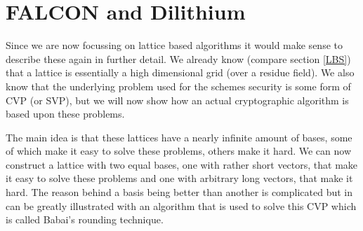 \documentclass[conference]{IEEEtran}
\newcommand{\comment}[1]{}
\begin{document}
\comment{ %
} %

\comment{ %
wahrscheinlich skippen da mir da hintergrund zu braid groups etc fehlt
} %

\comment{ %
not in the endgame but also not broken afaik
} %

\section{FALCON and Dilithium}\label{falcon}
\comment{ %
falcon-512 (L1):
pubk/sig 897/690 bytes (dil3: 1472/2701 ecdsa: 64)
keygen: 182m clk , 118mJ (dil3: 2.3m / 1.7mJ ecdsa 5mJ)
sign/ver: 23.5/0.345 mJ (dil3 5mJ/1.7mJ ecdsa 4mJ)

falcon-1024 (L5):
pubk/sig 1793/1330 bytes
keygen: 380m clk , 232mJ
sign/ver: 45.5/0.69 mJ
\cite{Energy_comp}

} %
Since we are now focussing on lattice based algorithms it would make sense to describe these again in further detail.
We already know (compare section \ref{LBS}) that a lattice is essentially a high dimensional grid (over a residue field). %
We also know that the underlying problem used for the schemes security is some form of CVP (or SVP), but we will now show how an actual cryptographic algorithm is based upon these problems.

The main idea is that these lattices have a nearly infinite amount of bases, some of which make it easy to solve these problems, others make it hard.
We can now construct a lattice with two equal bases, one with rather short vectors, that make it easy to solve these problems and one with arbitrary long vectors, that make it hard.
The reason behind a basis being better than another is complicated but in can be greatly illustrated with an algorithm that is used to solve this CVP which is called Babai's rounding technique.\cite{CVP_algorithms}
\end{document}
